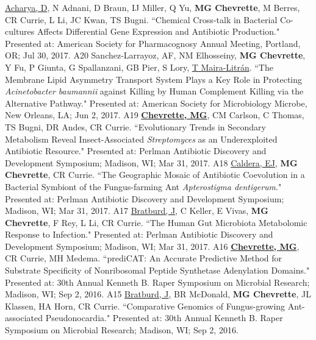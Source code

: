 
\begin{cvpubs}
  \cvpub
    {\underline{Acharya, D}, N Adnani, D Braun, IJ Miller, Q Yu, \textbf{MG Chevrette}, M Berres, CR Currie, L Li, JC Kwan, TS Bugni. ``Chemical Cross-talk in Bacterial Co-cultures Affects Differential Gene Expression and Antibiotic Production." Presented at: American Society for Pharmacognosy Annual Meeting, Portland, OR; Jul 30, 2017.} %
    {A20} %
  \cvpub
    {Sanchez-Larrayoz, AF, NM Elhosseiny, \textbf{MG Chevrette}, Y Fu, P Giunta, G Spallanzani, GB Pier, S Lory, \underline{T Maira-Litr\'{a}n}. ``The Membrane Lipid Asymmetry Transport System Plays a Key Role in Protecting \textit{Acinetobacter baumannii} against Killing by Human Complement Killing via the Alternative Pathway." Presented at: American Society for Microbiology Microbe, New Orleans, LA; Jun 2, 2017.} %
    {A19} %
  \cvpub
    {\underline{\textbf{Chevrette, MG}}, CM Carlson, C Thomas, TS Bugni, DR Andes, CR Currie. ``Evolutionary Trends in Secondary Metabolism Reveal Insect-Associated \textit{Streptomyces} as an Underexploited Antibiotic Resource." Presented at: Perlman Antibiotic Discovery and Development Symposium; Madison, WI; Mar 31, 2017.} %
    {A18} %
  \cvpub
    {\underline{Caldera, EJ}, \textbf{MG Chevrette}, CR Currie. ``The Geographic Mosaic of Antibiotic Coevolution in a Bacterial Symbiont of the Fungus-farming Ant \textit{Apterostigma dentigerum}." Presented at: Perlman Antibiotic Discovery and Development Symposium; Madison, WI; Mar 31, 2017.} %
    {A17} %
  \cvpub
    {\underline{Bratburd, J}, C Keller, E Vivas, \textbf{MG Chevrette}, F Rey, L Li, CR Currie. ``The Human Gut Microbiota Metabolomic Response to Infection." Presented at: Perlman Antibiotic Discovery and Development Symposium; Madison, WI; Mar 31, 2017.} %
    {A16} %
  \cvpub
    {\textbf{\underline{Chevrette, MG}}, CR Currie, MH Medema.  ``prediCAT: An Accurate Predictive Method for Substrate Specificity of Nonribosomal Peptide Synthetase Adenylation Domains." Presented at: 30th Annual Kenneth B. Raper Symposium on Microbial Research; Madison, WI; Sep 2, 2016.} %
    {A15} %
  \cvpub
    {\underline{Bratburd, J}, BR McDonald, \textbf{MG Chevrette}, JL Klassen, HA Horn, CR Currie. ``Comparative Genomics of Fungus-growing Ant-associated Pseudonocardia." Presented at: 30th Annual Kenneth B. Raper Symposium on Microbial Research; Madison, WI; Sep 2, 2016.} %

\end{cvpubs}
